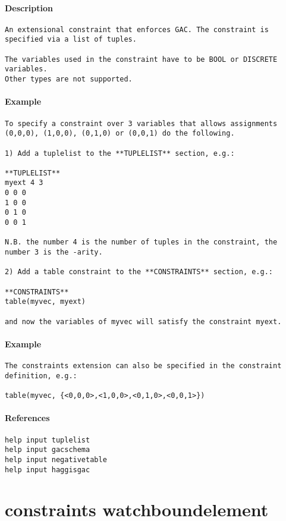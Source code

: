 \paragraph{Description}
{\footnotesize
\begin{verbatim}
An extensional constraint that enforces GAC. The constraint is
specified via a list of tuples.

The variables used in the constraint have to be BOOL or DISCRETE variables.
Other types are not supported.
\end{verbatim}
}
\paragraph{Example}
{\footnotesize
\begin{verbatim}
To specify a constraint over 3 variables that allows assignments
(0,0,0), (1,0,0), (0,1,0) or (0,0,1) do the following.

1) Add a tuplelist to the **TUPLELIST** section, e.g.:

**TUPLELIST**
myext 4 3
0 0 0
1 0 0
0 1 0
0 0 1

N.B. the number 4 is the number of tuples in the constraint, the
number 3 is the -arity.

2) Add a table constraint to the **CONSTRAINTS** section, e.g.:

**CONSTRAINTS**
table(myvec, myext)

and now the variables of myvec will satisfy the constraint myext.
\end{verbatim}
}
\paragraph{Example}
{\footnotesize
\begin{verbatim}
The constraints extension can also be specified in the constraint
definition, e.g.:

table(myvec, {<0,0,0>,<1,0,0>,<0,1,0>,<0,0,1>})
\end{verbatim}
}
\paragraph{References}
{\footnotesize
\begin{verbatim}
help input tuplelist
help input gacschema
help input negativetable
help input haggisgac
\end{verbatim}
}
\section{constraints watchboundelement}
